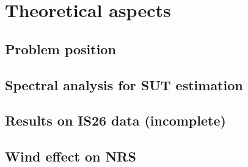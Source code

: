 \documentclass[a4paper, 12pt]{report}
\begin{document}
 \sloppy
 
\tableofcontents
\part{Theoretical aspects}
\chapter{Problem position}


\chapter{Spectral analysis for SUT estimation}
\label{chap:spectralanalysis}


%

\chapter{Results on IS26 data (incomplete)}
\label{chap:IS26results}



\chapter{Wind effect on NRS}
\label{chap:windonNRS}

\end{document}
